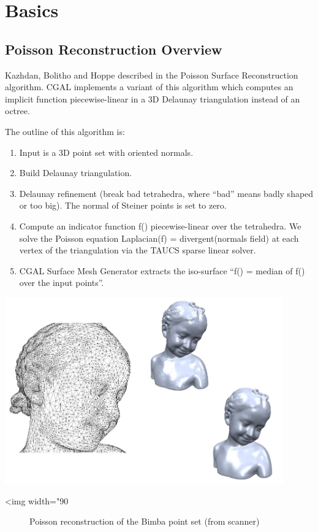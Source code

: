 \section{Basics}


\subsection{Poisson Reconstruction Overview}

Kazhdan, Bolitho and Hoppe described in \cite{Kazhdan06}
the Poisson Surface Reconstruction algorithm.
CGAL implements a variant of this algorithm which computes an implicit function
piecewise-linear in a 3D Delaunay triangulation instead of an octree.

The outline of this algorithm is:

\begin{enumerate}
\item Input is a 3D point set with oriented normals.
\item Build Delaunay triangulation.
\item Delaunay refinement (break bad tetrahedra, where {}``bad'' means
badly shaped or too big). The normal of Steiner points is set to zero.
\item Compute an indicator function f() piecewise-linear over the tetrahedra.
We solve the Poisson equation Laplacian(f) = divergent(normals field)
at each vertex of the triangulation via the TAUCS sparse linear solver.
\item CGAL Surface Mesh Generator extracts the iso-surface {}``f() = median
of f() over the input points''.
\end{enumerate}

\begin{center}
    \label{Surface_reconstruction_3-fig-poisson}
    \begin{ccTexOnly}
        \includegraphics[width=0.9\textwidth]{Surface_reconstruction_3/poisson} %
    \end{ccTexOnly}
    \begin{ccHtmlOnly}
        <img width="90%
    \end{ccHtmlOnly}
    \begin{figure}[h]
        \caption{Poisson reconstruction of the Bimba point set (from scanner)}
    \end{figure}
\end{center}


